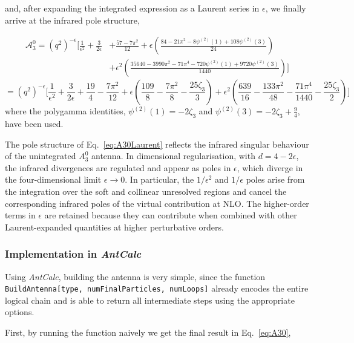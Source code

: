 and, after expanding the integrated expression as a Laurent series in $\epsilon$, we finally 
arrive at the infrared pole structure,

\begin{equation*}
    \begin{split}
        \mathcal A_3^0 = \left(q^2\right)^{-\epsilon}\Bigg[\frac1{\epsilon^2}+\frac3{2\epsilon}&+\frac{57-7\pi^2}{12}+\epsilon\left(\frac{84-21\pi^2-8\psi^{(2)}(1)+108\psi^{(2)}(3)}{24}\right)\\
        &+\epsilon^2\left(\frac{35640-3990\pi^2-71\pi^4-720\psi^{(2)}(1)+9720\psi^{(2)}(3)}{1440}\right)\Bigg]
    \end{split}
\end{equation*}
\begin{equation}
    = \left(q^2\right)^{-\epsilon}\Bigg[\frac1{\epsilon^2}+\frac3{2\epsilon}+\frac{19}4-\frac{7\pi^2}{12}+\epsilon\left(\frac{109}{8}-\frac{7\pi^2}8-\frac{25\zeta_3}{3}\right)+\epsilon^2\left(\frac{639}{16}-\frac{133\pi^2}{48}-\frac{71\pi^4}{1440}-\frac{25\zeta_3}{2}\right)\Bigg]\label{eq:A30Laurent}
\end{equation}
where the polygamma identities, $\psi^{(2)}(1) = -2\zeta_3$ and $\psi^{(2)}(3) = -2\zeta_3 + \frac94$,
have been used.

The pole structure of Eq.~\eqref{eq:A30Laurent} reflects the infrared singular behaviour of the
unintegrated $A_3^0$ antenna. In dimensional regularisation, with $d=4-2\epsilon$, the infrared
divergences are regulated and appear as poles in $\epsilon$, which diverge in the four-dimensional
limit $\epsilon\to0$. In particular, the $1/\epsilon^2$ and $1/\epsilon$ poles arise from the
integration over the soft and collinear unresolved regions and cancel the corresponding infrared
poles of the virtual contribution at NLO. The higher-order terms in $\epsilon$ are retained because
they can contribute when combined with other Laurent-expanded quantities at higher perturbative
orders.

\subsubsection*{Implementation in \textit{AntCalc}}

Using \textit{AntCalc}, building the antenna is very simple, since the
function \texttt{BuildAntenna[type, numFinalParticles, numLoops]} already encodes the entire 
logical chain and is able to return all intermediate steps using the appropriate options. 

First, by running the function naively we get the final result in Eq.~\eqref{eq:A30},

